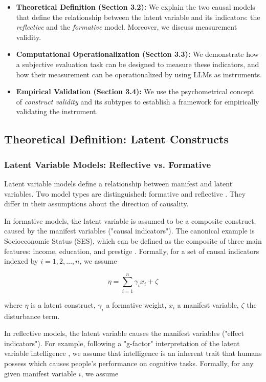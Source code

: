 \begin{itemize}
    \item \textbf{Theoretical Definition (Section 3.2):} We explain the two causal models that define the relationship between the latent variable and its indicators: the \emph{reflective} and the \emph{formative} model. Moreover, we discuss measurement validity.
    \item \textbf{Computational Operationalization (Section 3.3):} We demonstrate how a subjective evaluation task can be designed to measure these indicators, and how their measurement can be operationalized by using LLMs as instruments.
    \item \textbf{Empirical Validation (Section 3.4):} We use the psychometrical concept of \textit{construct validity} and its subtypes to establish a framework for empirically validating the instrument.
\end{itemize}


\subsection{Theoretical Definition: Latent Constructs}

\subsubsection{Latent Variable Models: Reflective vs. Formative}

Latent variable models define a relationship between manifest and latent variables. Two model types are distinguished: formative and reflective \citep{bollen1991conventional}. They differ in their assumptions about the direction of causality. 

In formative models, the latent variable is assumed to be a composite construct, caused by the manifest variables ("causal indicators"). The canonical example is Socioeconomic Status (SES), which can be defined as the composite of three main features: income, education, and prestige \citep{mcquitty2013structural}. Formally, for a set of causal indicators indexed by $i = 1,2, \dots ,n$, we assume

\begin{equation}
    \eta = \sum_{i=1}^{n} \gamma_i x_i + \zeta
\end{equation}

where $\eta$ is a latent construct, $\gamma_i$ a formative weight, $x_i$ a manifest variable, $\zeta$ the disturbance term. 

In reflective models, the latent variable causes the manifest variables ("effect indicators"). For example, following a "g-factor" interpretation of the latent variable intelligence \citep{spearman1961general}, we assume that intelligence is an inherent trait that humans possess which causes people's performance on cognitive tasks. Formally, for any given manifest variable $i$, we assume

